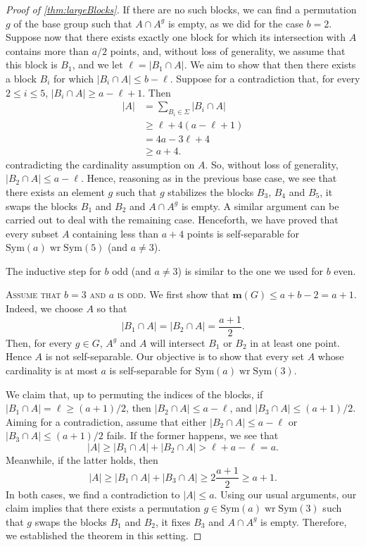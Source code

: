 \documentclass[a4paper]{amsart}
\newcommand{\Sym}{\mathrm{Sym}}
\renewcommand{\wr}{\mathop{\mathrm{wr}}}
\newcommand{\m}{\mathbf{m}}
\theoremstyle{definition}
\begin{document}
\begin{proof}[Proof of \cref{thm:largeBlocks}]
   If there are no such blocks, we can find a permutation $g$ of the base group such that $A \cap A^g$ is empty, as we did for the case $b=2$. Suppose now that there exists exactly one block for which its intersection with $A$ contains more than $a/2$ points, and, without loss of generality, we assume that this block is $B_1$, and we let $\ell = |B_1 \cap A|$. We aim to show that then there exists a block $B_i$ for which $|B_i \cap A| \leq b - \ell$. Suppose for a contradiction that, for every $2 \leq i \leq 5$, $|B_i \cap A| \ge a - \ell +1.$ Then
    \begin{align*}
        |A| &= \sum_{B_i \in \Sigma}|B_i \cap A| 
        \\&\geq \ell + 4( a -\ell + 1)
        \\&= 4a - 3\ell +4
        \\&\geq a+4 .
    \end{align*}
    contradicting the cardinality assumption on $A$. So, without loss of generality, $|B_2 \cap A| \leq a - \ell$. Hence, reasoning as in the previous base case, we see that there exists an element $g$ such that $g$ stabilizes the blocks $B_3$, $B_4$ and $B_5$, it swaps the blocks $B_1$ and $B_2$ and $A \cap A^g$ is empty. A similar argument can be carried out to deal with the remaining case. Henceforth, we have proved that every subset $A$ containing less than $a+4$ points is self-separable for $\Sym(a) \wr \Sym(5)$ (and $a\neq 3$).

    The inductive step for $b$ odd (and $a \neq 3$) is similar to the one we used for $b$ even.

    \smallskip
    \noindent \textsc{Assume that $b=3$ and $a$ is odd.}
    We first show that $\m(G) \le a+b-2 = a+1$. Indeed, we choose $A$ so that
    \[\vert B_1\cap A\vert=\vert B_2\cap A\vert= \frac{a+1}{2} .\]
    Then, for every $g\in G$, $A^g$ and $A$ will intersect $B_1$ or $B_2$ in at least one point. Hence $A$ is not self-separable. Our objective is to show that every set $A$ whose cardinality is at most $a$ is self-separable for $\Sym(a) \wr \Sym(3)$.

    We claim that, up to permuting the indices of the blocks, if $\vert B_1\cap A\vert = \ell \geq (a+1)/2 $, then $\vert B_2\cap A\vert\leq a-\ell$, and $\vert B_3\cap A\vert\leq (a+1)/2 $. Aiming for a contradiction, assume that either $\vert B_2\cap A\vert\leq a-\ell$ or $\vert B_3\cap A\vert\leq (a+1)/2$ fails. If the former happens, we see that
    \[ |A| \geq |B_1 \cap A| + |B_2 \cap A| > \ell + a - \ell = a .\]
    Meanwhile, if the latter holds, then
    \[ |A| \geq |B_1 \cap A| + |B_3 \cap A| \ge 2 \frac{a+1}{2} \ge a+1.\]
    In both cases, we find a contradiction to $|A|\le a$. Using our usual arguments, our claim implies that there exists a permutation $g\in \Sym(a) \wr \Sym(3)$ such that $g$ swaps the blocks $B_1$ and $B_2$, it fixes $B_3$ and $A\cap A^g$ is empty. Therefore, we established the theorem in this setting.
    

\end{proof}
\end{document}
